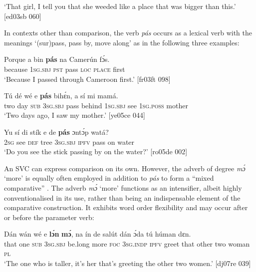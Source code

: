 \glt ‘That girl, I tell you that she weeded like a place that was bigger
than this.’ [ed03sb 060]
\z

In contexts other than comparison, the verb \textit{pás} occurs as a lexical verb with the meanings ‘(sur)pass, pass by, move along’ as in the following three examples: 


\ea%
    \label{ex:key:468}
    \gll Porque  a    bin  \textbf{pás}  na  Camerún    fɔ́s.\\
because  \textsc{1sg.sbj}  \textsc{pst}  pass  \textsc{loc}  \textsc{place}    first\\

\glt ‘Because I passed through Cameroon first.’ [fr03ft 098]
\z


\ea%
    \label{ex:key:469}
    \gll Tú  dé  wé  e    \textbf{pás}  bihɛ́n,  a    sí  mi    mamá.\\
two  day  \textsc{sub}  \textsc{3sg.sbj}  pass  behind  \textsc{1sg.sbj}  see  \textsc{1sg.poss}  mother\\

\glt ‘Two days ago, I saw my mother.’ [ye05ce 044]
\z


\ea%
    \label{ex:key:470}
    \gll Yu  sí  di  stík    e    de  \textbf{pás}  ɔntɔ́p  watá?\\
\textsc{2sg}  see  \textsc{def}  tree    \textsc{3sg.sbj}  \textsc{ipfv}  pass  on    water\\

\glt ‘Do you see the stick passing by on the water?’ [ro05de 002]
\z

An SVC can express comparison  on its own. However, the adverb of degree \textit{mɔ́} ‘more’ is equally often employed in addition to \textit{pás} to form a “mixed comparative” \citep{Stassen1985}. The adverb \textit{mɔ́} ‘more’ functions as an intensifier, albeit highly conventionalised in its use, rather than being an indispensable element of the comparative construction. It exhibits word order flexibility and may occur after  or before  the parameter verb:


\ea%
    \label{ex:key:471}
    \gll Dán  wán  wé  e    \textbf{lɔ́n}    \textbf{mɔ́},    na  ín
de  salút  dán  ɔ́da    tú  húman  dɛn.\\
that  one  \textsc{sub}  \textsc{3sg.sbj}  be.long  more  \textsc{foc}  \textsc{3sg.indp}
\textsc{ipfv}  greet  that  other  two  woman  \textsc{pl}\\

\glt ‘The one who is taller, it’s her that’s greeting the other two
women.’ [dj07re 039]
\z


